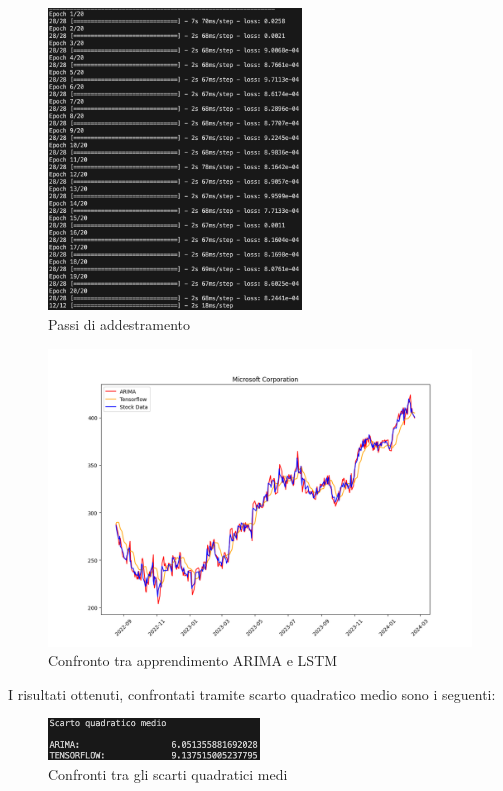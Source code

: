 \documentclass[a4paper,12pt]{article}
\begin{document}
            \begin{figure}[H]
                \centering
                \includegraphics[width=0.6\textwidth]{LSTM3-2.png}
                \caption{Passi di addestramento}
            \end{figure}
            \begin{figure}[H]
                \includegraphics[width=\textwidth]{GRAFICO3.png}
                \caption{Confronto tra apprendimento ARIMA e LSTM}
            \end{figure}
            I risultati ottenuti, confrontati tramite scarto quadratico medio
            sono i seguenti:
            \begin{figure}[H]
                \centering
                \includegraphics[width=0.5\textwidth]{SQM3.png}
                \caption{Confronti tra gli scarti quadratici medi}
            \end{figure}
\end{document}
